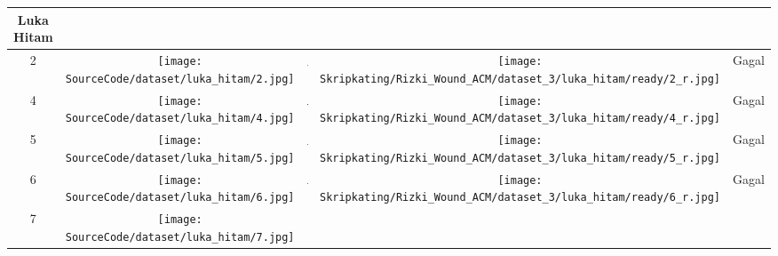 \begin{longtable}[width = 8cm]{| c | c | c | c | c |}
        {Luka Hitam}
        \\
        \hline
        2 &
        \texttt{[image: SourceCode/dataset/luka\_hitam/2.jpg]} &
        \includegraphics[keepaspectratio, width=2cm]
        {gambar/Data/BorderFollowing/Hitam/2 - failed.jpg} &
        \texttt{[image: Skripkating/Rizki\_Wound\_ACM/dataset\_3/luka\_hitam/ready/2\_r.jpg]} &
        Gagal
        \\
        \hline
        4 &
        \texttt{[image: SourceCode/dataset/luka\_hitam/4.jpg]} &
        \includegraphics[keepaspectratio, width=2cm]
        {gambar/Data/BorderFollowing/Hitam/4 - failed.jpg} &
        \texttt{[image: Skripkating/Rizki\_Wound\_ACM/dataset\_3/luka\_hitam/ready/4\_r.jpg]} &
        Gagal
        \\
        \hline
        5 &
        \texttt{[image: SourceCode/dataset/luka\_hitam/5.jpg]} &
        \includegraphics[keepaspectratio, width=2cm]
        {gambar/Data/BorderFollowing/Hitam/5 - failed.jpg} &
        \texttt{[image: Skripkating/Rizki\_Wound\_ACM/dataset\_3/luka\_hitam/ready/5\_r.jpg]} &
        Gagal
        \\
        \hline
        6 &
        \texttt{[image: SourceCode/dataset/luka\_hitam/6.jpg]} &
        \includegraphics[keepaspectratio, width=2cm]
        {gambar/Data/BorderFollowing/Hitam/6 - failed.jpg} &
        \texttt{[image: Skripkating/Rizki\_Wound\_ACM/dataset\_3/luka\_hitam/ready/6\_r.jpg]} &
        Gagal
        \\
        \hline
        7 &
        \texttt{[image: SourceCode/dataset/luka\_hitam/7.jpg]} &
        \includegraphics[keepaspectratio, width=2cm]

\end{longtable}
